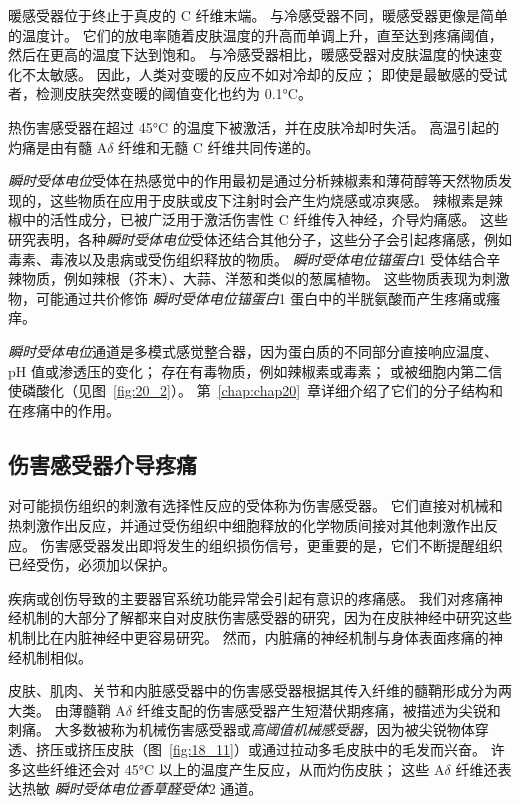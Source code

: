 暖感受器位于终止于真皮的 C 纤维末端。
与冷感受器不同，暖感受器更像是简单的温度计。
它们的放电率随着皮肤温度的升高而单调上升，直至达到疼痛阈值，然后在更高的温度下达到饱和。
与冷感受器相比，暖感受器对皮肤温度的快速变化不太敏感。
因此，人类对变暖的反应不如对冷却的反应；
即使是最敏感的受试者，检测皮肤突然变暖的阈值变化也约为 0.1°C。


热伤害感受器在超过 45°C 的温度下被激活，并在皮肤冷却时失活。
高温引起的灼痛是由有髓 A$\delta$ 纤维和无髓 C 纤维共同传递的。


\textit{瞬时受体电位}受体在热感觉中的作用最初是通过分析辣椒素和薄荷醇等天然物质发现的，这些物质在应用于皮肤或皮下注射时会产生灼烧感或凉爽感。
辣椒素是辣椒中的活性成分，已被广泛用于激活伤害性 C 纤维传入神经，介导灼痛感。
这些研究表明，各种\textit{瞬时受体电位}受体还结合其他分子，这些分子会引起疼痛感，例如毒素、毒液以及患病或受伤组织释放的物质。
\textit{瞬时受体电位锚蛋白}1 受体结合辛辣物质，例如辣根（芥末）、大蒜、洋葱和类似的葱属植物。
这些物质表现为刺激物，可能通过共价修饰 \textit{瞬时受体电位锚蛋白}1 蛋白中的半胱氨酸而产生疼痛或瘙痒。


\textit{瞬时受体电位}通道是多模式感觉整合器，因为蛋白质的不同部分直接响应温度、pH 值或渗透压的变化；
存在有毒物质，例如辣椒素或毒素；
或被细胞内第二信使磷酸化（见图~\ref{fig:20_2}）。
第~\ref{chap:chap20}~章详细介绍了它们的分子结构和在疼痛中的作用。



\subsection{伤害感受器介导疼痛}

对可能损伤组织的刺激有选择性反应的受体称为伤害感受器。
它们直接对机械和热刺激作出反应，并通过受伤组织中细胞释放的化学物质间接对其他刺激作出反应。
伤害感受器发出即将发生的组织损伤信号，更重要的是，它们不断提醒组织已经受伤，必须加以保护。


疾病或创伤导致的主要器官系统功能异常会引起有意识的疼痛感。
我们对疼痛神经机制的大部分了解都来自对皮肤伤害感受器的研究，因为在皮肤神经中研究这些机制比在内脏神经中更容易研究。
然而，内脏痛的神经机制与身体表面疼痛的神经机制相似。


皮肤、肌肉、关节和内脏感受器中的伤害感受器根据其传入纤维的髓鞘形成分为两大类。
由薄髓鞘 A$\delta$ 纤维支配的伤害感受器产生短潜伏期疼痛，被描述为尖锐和刺痛。
大多数被称为机械伤害感受器或\textit{高阈值机械感受器}，因为被尖锐物体穿透、挤压或挤压皮肤（图~\ref{fig:18_11}）或通过拉动多毛皮肤中的毛发而兴奋。
许多这些纤维还会对 45°C 以上的温度产生反应，从而灼伤皮肤；
这些 A$\delta$ 纤维还表达热敏 \textit{瞬时受体电位香草醛受体}2 通道。


